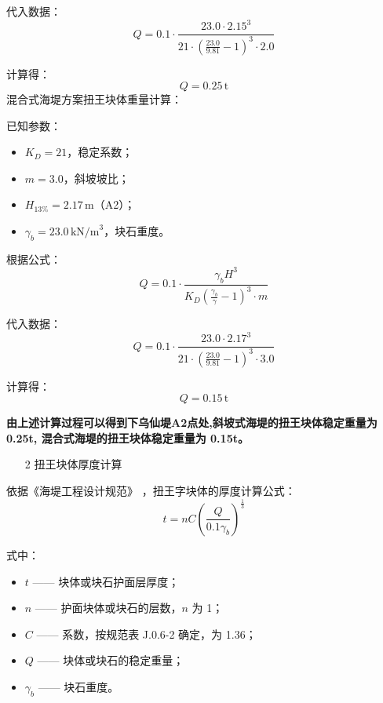 \documentclass[UTF8, a4paper, 12pt]{ctexart} %
\begin{document}
代入数据：
\[
    Q = 0.1 \cdot \frac{23.0 \cdot 2.15^3}{21 \cdot \left( \frac{23.0}{9.81} - 1 \right)^3 \cdot 2.0}
\]

计算得：
\[
    Q = 0.25\,\text{t}
\]
混合式海堤方案扭王块体重量计算：

已知参数：

\begin{itemize}
    \item $K_D = 21$，稳定系数；
    \item $m = 3.0$，斜坡坡比；
    \item $H_{13\%} = 2.17\,\text{m}$（A2）；
    \item $\gamma_b = 23.0\,\text{kN/m}^3$，块石重度。
\end{itemize}


根据公式：
\begin{equation}
    Q = 0.1 \cdot \frac{\gamma_b H^3}{K_D \left( \frac{\gamma_b}{\gamma} - 1 \right)^3 \cdot m}
\end{equation}

代入数据：
\[
    Q = 0.1 \cdot \frac{23.0 \cdot 2.17^3}{21 \cdot \left( \frac{23.0}{9.81} - 1 \right)^3 \cdot 3.0}
\]

计算得：
\[
    Q = 0.15\,\text{t}
\]

\textbf{由上述计算过程可以得到下乌仙堤A2点处,斜坡式海堤的扭王块体稳定重量为
0.25t, 混合式海堤的扭王块体稳定重量为 0.15t。}


\begin{itemize}
    \item [2] 扭王块体厚度计算
\end{itemize}
\par
依据《海堤工程设计规范》 ，扭王字块体的厚度计算公式：
\begin{equation}
    t = nC \left( \frac{Q}{0.1 \gamma_b} \right)^{\frac{1}{3}}
\end{equation}

式中：
\begin{itemize}
    \item $t$ —— 块体或块石护面层厚度；
    \item $n$ —— 护面块体或块石的层数，$n$ 为 1；
    \item $C$ —— 系数，按规范表 J.0.6-2 确定，为 1.36；
    \item $Q$ —— 块体或块石的稳定重量；
    \item $\gamma_b$ —— 块石重度。
\end{itemize}

\par
\end{document}
